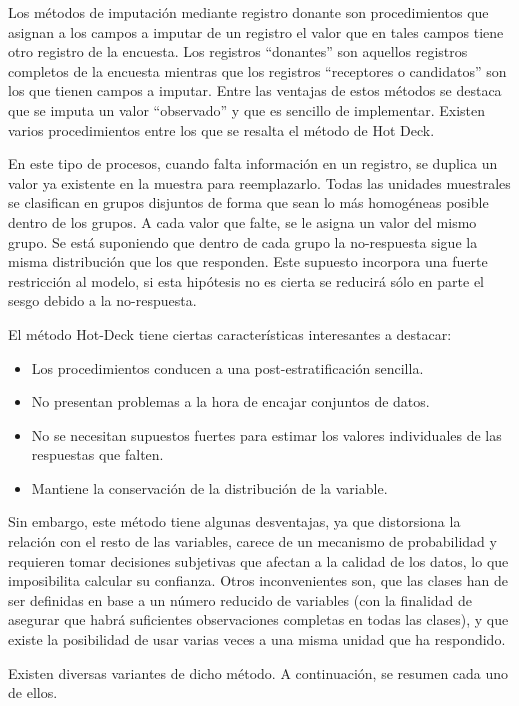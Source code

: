 \documentclass[
  openany]{book}
\begin{document}
Los métodos de imputación mediante registro donante son procedimientos que asignan a los campos a imputar de un registro el valor que en tales campos tiene otro registro de la encuesta. Los registros ``donantes'' son aquellos registros completos de la encuesta mientras que los registros ``receptores o candidatos'' son los que tienen campos a imputar. Entre las ventajas de estos métodos se destaca que se imputa un valor ``observado'' y que es sencillo de implementar. Existen varios procedimientos entre los que se resalta el método de Hot Deck.

En este tipo de procesos, cuando falta información en un registro, se duplica un valor ya existente en la muestra para reemplazarlo. Todas las unidades muestrales se clasifican en grupos disjuntos de forma que sean lo más homogéneas posible dentro de los grupos. A cada valor que falte, se le asigna un valor del mismo grupo. Se está suponiendo que dentro de cada grupo la no-respuesta sigue la misma distribución que los que responden. Este supuesto incorpora una fuerte restricción al modelo, si esta hipótesis no es cierta se reducirá sólo en parte el sesgo debido a la no-respuesta.

El método Hot-Deck tiene ciertas características interesantes a destacar:

\begin{itemize}
\item
  Los procedimientos conducen a una post-estratificación sencilla.
\item
  No presentan problemas a la hora de encajar conjuntos de datos.
\item
  No se necesitan supuestos fuertes para estimar los valores individuales de las respuestas que falten.
\item
  Mantiene la conservación de la distribución de la variable.
\end{itemize}

Sin embargo, este método tiene algunas desventajas, ya que distorsiona la relación con el resto de las variables, carece de un mecanismo de probabilidad y requieren tomar decisiones subjetivas que afectan a la calidad de los datos, lo que imposibilita calcular su confianza. Otros inconvenientes son, que las clases han de ser definidas en base a un número reducido de variables (con la finalidad de asegurar que habrá suficientes observaciones completas en todas las clases), y que existe la posibilidad de usar varias veces a una misma unidad que ha respondido.

Existen diversas variantes de dicho método. A continuación, se resumen cada uno de ellos.
\end{document}
